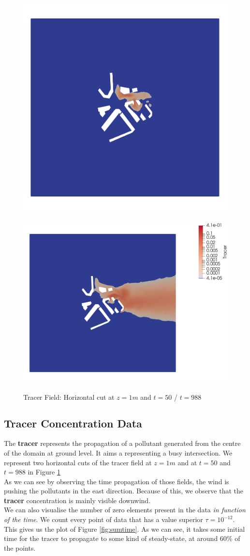 \begin{figure}[h!]
\centering
  \includegraphics[height=0.4\linewidth]{figures/Analysis/tracer050cutZ1}
~
  \includegraphics[height=0.4\linewidth]{figures/Analysis/tracer988cutZ1}
  \caption{Tracer Field: Horizontal cut at $z=1m$ and  $t=50$ / $t=988$}
  \label{fig:view:tracerend}
\end{figure}

 \subsection{Tracer Concentration Data}


The \textbf{tracer} represents the propagation of a pollutant generated from the centre of the domain at ground level. It aims a representing a busy intersection. We represent two horizontal cuts of the tracer field at $z=1m$ and at $t=50$ and $t=988$ in Figure \ref{fig:view:tracerend}\\


As we can see by observing the time propagation of those fields,  the wind is pushing the pollutants in the east direction. Because of this, we observe that the \textbf{tracer} concentration is mainly visible downwind. \\


We can also visualise the number of zero elements present in the data \textit{in function of the time}. We count every point of data that has a value superior $\tau = 10^{-12}$. This gives us the plot of Figure \ref{fig:sumtime}. As we can see, it takes some initial time for the tracer to propagate to some kind of steady-state, at around 60\% of the points. \\

